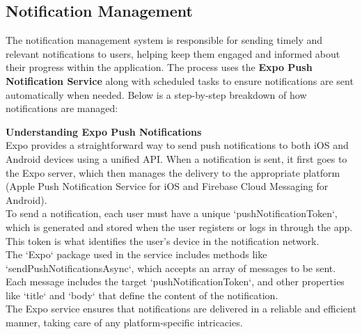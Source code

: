 \subsection{Notification Management}

The notification management system is responsible for sending timely and relevant notifications to users, helping keep them engaged and informed about their progress within the application. The process uses the \textbf{Expo Push Notification Service} along with scheduled tasks to ensure notifications are sent automatically when needed. Below is a step-by-step breakdown of how notifications are managed:

\vspace{5mm}

\noindent \textbf{Understanding Expo Push Notifications} \\
Expo provides a straightforward way to send push notifications to both iOS and Android devices using a unified API. When a notification is sent, it first goes to the Expo server, which then manages the delivery to the appropriate platform (Apple Push Notification Service for iOS and Firebase Cloud Messaging for Android).\vspace{5mm} \\
To send a notification, each user must have a unique `pushNotificationToken`, which is generated and stored when the user registers or logs in through the app. This token is what identifies the user's device in the notification network.\vspace{5mm} \\
The `Expo` package used in the service includes methods like `sendPushNotificationsAsync`, which accepts an array of messages to be sent. Each message includes the target `pushNotificationToken`, and other properties like `title` and `body` that define the content of the notification.\vspace{5mm} \\
The Expo service ensures that notifications are delivered in a reliable and efficient manner, taking care of any platform-specific intricacies.

\vspace{5mm}

